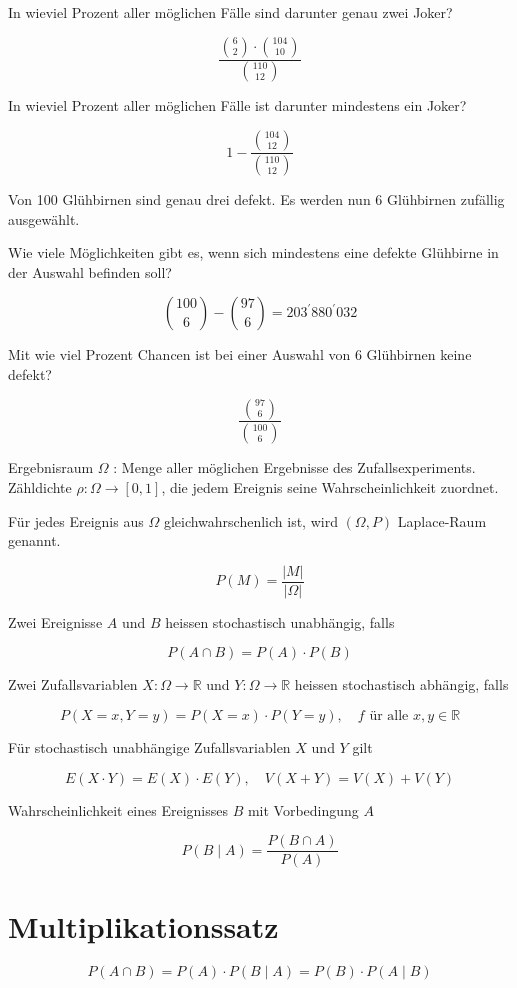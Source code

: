 \documentclass[10pt]{article}
\begin{document}
In wieviel Prozent aller möglichen Fälle sind darunter genau zwei Joker?

$$
\frac{\binom{6}{2} \cdot\binom{104}{10}}{\binom{110}{12}}
$$

In wieviel Prozent aller möglichen Fälle ist darunter mindestens ein Joker?

$$
1-\frac{\binom{104}{12}}{\binom{110}{12}}
$$

Von 100 Glühbirnen sind genau drei defekt. Es werden nun 6 Glühbirnen zufällig ausgewählt.

Wie viele Möglichkeiten gibt es, wenn sich mindestens eine defekte Glühbirne in der Auswahl befinden soll?

$$
\binom{100}{6}-\binom{97}{6}=203^{\prime} 880^{\prime} 032
$$

Mit wie viel Prozent Chancen ist bei einer Auswahl von 6 Glühbirnen keine defekt?

$$
\frac{\binom{97}{6}}{\binom{100}{6}}
$$

Ergebnisraum $\Omega$ : Menge aller möglichen Ergebnisse des Zufallsexperiments. Zähldichte $\rho: \Omega \rightarrow[0,1]$, die jedem Ereignis seine Wahrscheinlichkeit zuordnet.

Für jedes Ereignis aus $\Omega$ gleichwahrschenlich ist, wird $(\Omega, P)$ Laplace-Raum genannt.

$$
P(M)=\frac{|M|}{|\Omega|}
$$

Zwei Ereignisse $A$ und $B$ heissen stochastisch unabhängig, falls

$$
P(A \cap B)=P(A) \cdot P(B)
$$

Zwei Zufallsvariablen $X: \Omega \rightarrow \mathbb{R}$ und $Y: \Omega \rightarrow \mathbb{R}$ heissen stochastisch abhängig, falls

$$
P(X=x, Y=y)=P(X=x) \cdot P(Y=y), \quad f \text { ür alle } x, y \in \mathbb{R}
$$

Für stochastisch unabhängige Zufallsvariablen $X$ und $Y$ gilt

$$
E(X \cdot Y)=E(X) \cdot E(Y), \quad V(X+Y)=V(X)+V(Y)
$$

Wahrscheinlichkeit eines Ereignisses $B$ mit Vorbedingung $A$

$$
P(B \mid A)=\frac{P(B \cap A)}{P(A)}
$$

\section*{Multiplikationssatz}
$$
P(A \cap B)=P(A) \cdot P(B \mid A)=P(B) \cdot P(A \mid B)
$$
\end{document}
